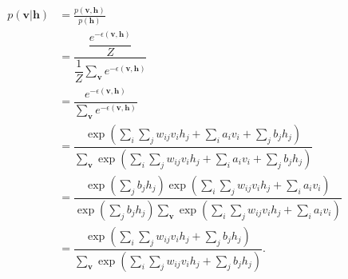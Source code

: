 \documentclass[10pt, a4paper]{article}
\begin{document}
\begin{align}
  p(\mathbf{v}|\mathbf{h}) &= \frac{p(\mathbf{v}, \mathbf{h})}{p(\mathbf{h})} \nonumber \\
  &= \dfrac{\dfrac{e^{-\epsilon(\mathbf{v}, \mathbf{h})}}{Z}}{\dfrac{1}{Z} \sum_{\mathbf{v}} e^{-\epsilon(\mathbf{v}, \mathbf{h})}} \nonumber \\
  &= \dfrac{e^{-\epsilon(\mathbf{v}, \mathbf{h})}}{\sum_{\mathbf{v}} e^{-\epsilon(\mathbf{v}, \mathbf{h})}} \nonumber \\
  &= \dfrac{\exp\left(\sum_i\sum_j w_{ij} v_i h_j+\sum_i a_i v_i + \sum_j b_j h_j\right)}
  {\sum_{\mathbf{v}} \exp\left(\sum_i\sum_j w_{ij} v_i h_j+\sum_i a_i v_i + \sum_j b_j h_j\right)} \nonumber \\
  &= \dfrac{\exp\left(\sum_j b_j h_j\right)\exp\left(\sum_i\sum_j w_{ij} v_i h_j + \sum_i a_i v_i\right)}
  {\exp\left(\sum_j b_j h_j\right)\sum_{\mathbf{v}} \exp\left(\sum_i\sum_j w_{ij} v_i h_j + \sum_i a_i v_i\right)} \nonumber \\
  &= \dfrac{\exp\left(\sum_i\sum_j w_{ij} v_i h_j + \sum_j b_j h_j\right)}
  {\sum_{\mathbf{v}} \exp\left(\sum_i\sum_j w_{ij} v_i h_j + \sum_j b_j h_j\right)}.
  \label{eq:visible_cond_prob_rewrite}
\end{align}
\end{document}
